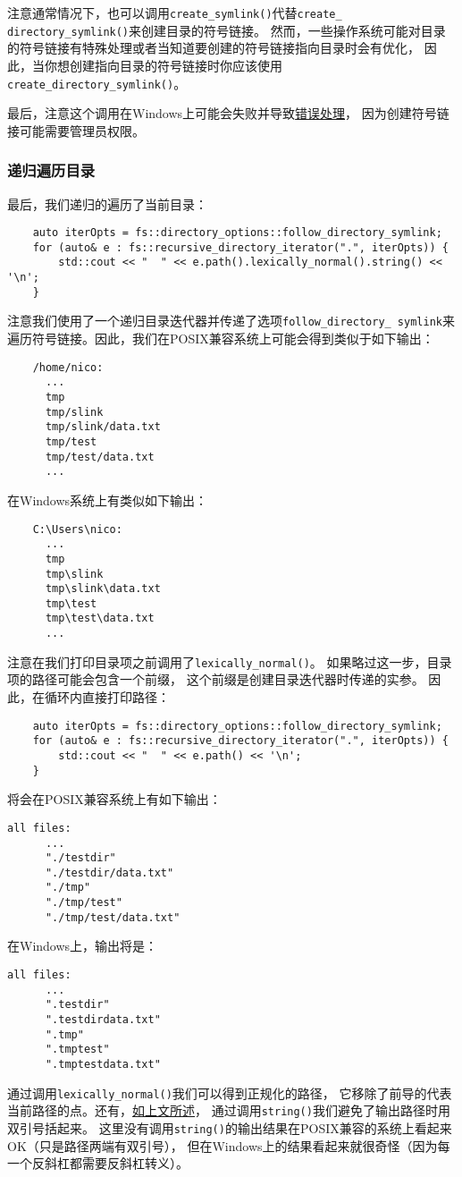 注意通常情况下，也可以调用\texttt{create\_symlink()}代替\texttt{create\_
directory\_symlink()}来创建目录的符号链接。
然而，一些操作系统可能对目录的符号链接有特殊处理或者当知道要创建的符号链接指向目录时会有优化，
因此，当你想创建指向目录的符号链接时你应该使用\texttt{create\_directory\_symlink()}。

最后，注意这个调用在Windows上可能会失败并导致\hyperref[创建链接失败]{错误处理}，
因为创建符号链接可能需要管理员权限。

\subsubsection{递归遍历目录}\label{ch20.1.3.5}
最后，我们递归的遍历了当前目录：
\begin{lstlisting}
    auto iterOpts = fs::directory_options::follow_directory_symlink;
    for (auto& e : fs::recursive_directory_iterator(".", iterOpts)) {
        std::cout << "  " << e.path().lexically_normal().string() << '\n';
    }
\end{lstlisting}
注意我们使用了一个递归目录迭代器并传递了选项\texttt{follow\_directory\_
symlink}来遍历符号链接。因此，我们在POSIX兼容系统上可能会得到类似于如下输出：
\begin{lstlisting}
    /home/nico:
      ...
      tmp
      tmp/slink
      tmp/slink/data.txt
      tmp/test
      tmp/test/data.txt
      ...
\end{lstlisting}
在Windows系统上有类似如下输出：
\begin{lstlisting}
    C:\Users\nico:
      ...
      tmp
      tmp\slink
      tmp\slink\data.txt
      tmp\test
      tmp\test\data.txt
      ...
\end{lstlisting}
注意在我们打印目录项之前调用了\texttt{lexically\_normal()}。
如果略过这一步，目录项的路径可能会包含一个前缀，
这个前缀是创建目录迭代器时传递的实参。
因此，在循环内直接打印路径：
\begin{lstlisting}
    auto iterOpts = fs::directory_options::follow_directory_symlink;
    for (auto& e : fs::recursive_directory_iterator(".", iterOpts)) {
        std::cout << "  " << e.path() << '\n';
    }
\end{lstlisting}
将会在POSIX兼容系统上有如下输出：
\begin{lstlisting}[stringstyle=\color{black}]
    all files:
      ...
      "./testdir"
      "./testdir/data.txt"
      "./tmp"
      "./tmp/test"
      "./tmp/test/data.txt"
\end{lstlisting}
在Windows上，输出将是：
\begin{lstlisting}[stringstyle=\color{black}]
    all files:
      ...
      ".testdir"
      ".testdirdata.txt"
      ".tmp"
      ".tmptest"
      ".tmptestdata.txt"
\end{lstlisting}
通过调用\texttt{lexically\_normal()}我们可以得到正规化的路径，
它移除了前导的代表当前路径的点。还有，\hyperref[ch20.1.1.1]{如上文所述}，
通过调用\texttt{string()}我们避免了输出路径时用双引号括起来。
这里没有调用\texttt{string()}的输出结果在POSIX兼容的系统上看起来OK（只是路径两端有双引号），
但在Windows上的结果看起来就很奇怪（因为每一个反斜杠都需要反斜杠转义）。

